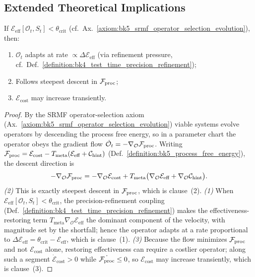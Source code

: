 \subsection{Extended Theoretical Implications}
\label{subsec:bk5_extended_theoretical_implications}
\begin{theorem} \label{theorem:bk5__srmf_operator_adaptation}

If $\mathcal{E}_{\text{eff}}[\mathcal{O}_t, S_t] < \theta_{\text{crit}}$ (cf.~Ax.~\ref{axiom:bk5_srmf_operator_selection_evolution}), then:
\begin{enumerate}
    \item $\mathcal{O}_t$ adapts at rate $\propto \Delta\mathcal{E}_{\text{eff}}$ (via refinement pressure, cf.~Def.~\ref{definition:bk4_test_time_precision_refinement});
    \item Follows steepest descent in $\mathcal{F}_{\text{proc}}$;
    \item $\mathcal{E}_{\text{cost}}$ may increase transiently.
\end{enumerate}
\end{theorem}
\begin{proof}
\label{proof:bk5__srmf_operator_adaptation}
\leavevmode
By the SRMF operator-selection axiom (Ax.~\ref{axiom:bk5_srmf_operator_selection_evolution}) viable systems evolve operators by descending the process free energy, so in a parameter chart the operator obeys the gradient flow $\dot{\mathcal{O}}_t=-\nabla_{\mathcal{O}}\mathcal{F}_{\text{proc}}$. Writing $\mathcal{F}_{\text{proc}}=\mathcal{E}_{\text{cost}}-T_{\text{meta}}(\mathcal{E}_{\text{eff}}+\mathcal{C}_{\text{hint}})$ (Def.~\ref{definition:bk5_process_free_energy}), the descent direction is
\[
-\nabla_{\mathcal{O}}\mathcal{F}_{\text{proc}}=-\nabla_{\mathcal{O}}\mathcal{E}_{\text{cost}}+T_{\text{meta}}\big(\nabla_{\mathcal{O}}\mathcal{E}_{\text{eff}}+\nabla_{\mathcal{O}}\mathcal{C}_{\text{hint}}\big).
\]
\emph{(2)} This is exactly steepest descent in $\mathcal{F}_{\text{proc}}$, which is clause~(2). \emph{(1)} When $\mathcal{E}_{\text{eff}}[\mathcal{O}_t,S_t]<\theta_{\text{crit}}$, the precision-refinement coupling (Def.~\ref{definition:bk4_test_time_precision_refinement}) makes the effectiveness-restoring term $T_{\text{meta}}\nabla_{\mathcal{O}}\mathcal{E}_{\text{eff}}$ the dominant component of the velocity, with magnitude set by the shortfall; hence the operator adapts at a rate proportional to $\Delta\mathcal{E}_{\text{eff}}=\theta_{\text{crit}}-\mathcal{E}_{\text{eff}}$, which is clause~(1). \emph{(3)} Because the flow minimizes $\mathcal{F}_{\text{proc}}$ and not $\mathcal{E}_{\text{cost}}$ alone, restoring effectiveness can require a costlier operator; along such a segment $\dot{\mathcal{E}}_{\text{cost}}>0$ while $\dot{\mathcal{F}_{\text{proc}}}\le 0$, so $\mathcal{E}_{\text{cost}}$ may increase transiently, which is clause~(3).
\end{proof}
